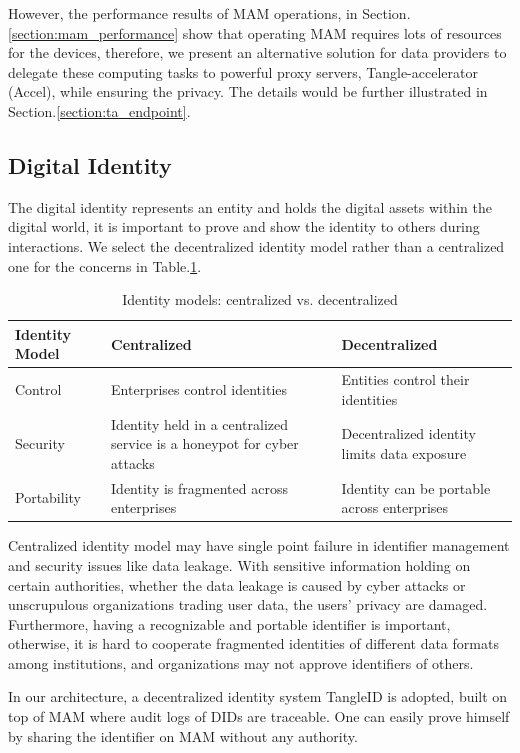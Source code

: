 \documentclass[conference]{IEEEtran}
\begin{document}
However, the performance results of MAM operations, in Section.\ref{section:mam_performance} show that operating MAM requires lots of resources for the devices, therefore, we present an alternative solution for data providers to delegate these computing tasks to powerful proxy servers, Tangle-accelerator (Accel)\cite{TA}, while ensuring the privacy. The details would be further illustrated in Section.\ref{section:ta_endpoint}.

\subsection{Digital Identity}
The digital identity represents an entity and holds the digital assets within the digital world, it is important to prove and show the identity to others during interactions. We select the decentralized identity model rather than a centralized one for the concerns in Table.\ref{tab:did}.
\begin{table}[h]
	\caption{Identity models: centralized vs. decentralized}
	\label{tab:did}
	\begin{tabularx}{\linewidth}{|l|X|X|}
	\hline
		\textbf{Identity Model} & \textbf{Centralized} & \textbf{Decentralized} \\
		\hline
		Control & Enterprises control identities & Entities control their identities \\
		\hline
		Security & Identity held in a centralized service is a honeypot for cyber attacks & Decentralized identity limits data exposure \\
		\hline
		Portability & Identity is fragmented across enterprises & Identity can be portable across enterprises \\
		\hline
	\end{tabularx}
\end{table}

Centralized identity model may have single point failure in identifier management and security issues like data leakage. With sensitive information holding on certain authorities, whether the data leakage is caused by cyber attacks or unscrupulous organizations trading user data, the users' privacy are damaged. Furthermore, having a recognizable and portable identifier is important, otherwise, it is hard to cooperate fragmented identities of different data formats among institutions, and organizations may not approve identifiers of others.

In our architecture, a decentralized identity system TangleID\cite{TangleID} is adopted, built on top of MAM where audit logs of DIDs are traceable. One can easily prove himself by sharing the identifier on MAM without any authority.
\end{document}
